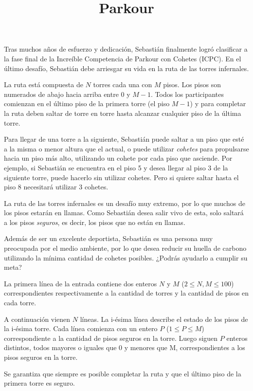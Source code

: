 \documentclass{oci}
\title{Parkour}
\begin{document}
\begin{problemDescription}
  Tras muchos años de esfuerzo y dedicación, Sebastián finalmente logró
  clasificar a la fase final de la Increíble Competencia de Parkour con
  Cohetes (ICPC).
  En el último desafío, Sebastián debe arriesgar
  su vida en la ruta de las torres infernales.

  La ruta está compuesta de $N$ torres cada una con
  $M$ pisos.
  Los pisos son numerados de abajo hacia arriba
  entre 0 y $M-1$.
  Todos los participantes comienzan en el último piso de la primera
  torre (el piso $M-1$) y para completar la ruta deben saltar de torre
  en torre hasta alcanzar cualquier piso de la última torre.

  Para llegar de una torre a la siguiente, Sebastián puede saltar a un piso
  que esté a la misma o menor altura que el actual, o puede utilizar \emph{cohetes}
  para propulsarse hacia un piso más alto, utilizando un cohete por cada piso que asciende.
  Por ejemplo, si Sebastián se encuentra en el piso 5 y desea llegar
  al piso 3 de la siguiente torre, puede hacerlo sin utilizar cohetes.
  Pero si quiere saltar hasta el piso 8 necesitará utilizar 3 cohetes.

  La ruta de las torres infernales es un desafío muy extremo, por
  lo que muchos de los pisos estarán en llamas.
  Como Sebastián desea salir vivo de esta, solo saltará a los pisos
  \emph{seguros}, es decir, los pisos que no están en llamas.

  Además de ser un excelente deportista, Sebastián es una persona muy
  preocupada por el medio ambiente, por lo que desea reducir su huella
  de carbono utilizando la mínima cantidad de cohetes posibles.
  ¿Podrás ayudarlo a cumplir su meta?

\end{problemDescription}

\begin{inputDescription}
  La primera línea de la entrada contiene dos enteros $N$ y $M$ ($2 \leq N, M \leq 100$)
  correspondientes respectivamente a la cantidad de torres y la cantidad de pisos en cada torre.

  A continuación vienen $N$ líneas.
  La i-ésima línea describe el estado de los pisos de la i-ésima torre.
  Cada línea comienza con un entero $P$ ($1 \leq P \leq M$) correspondiente
  a la cantidad de pisos seguros en la torre.
  Luego siguen $P$ enteros distintos, todos mayores o iguales que $0$ y menores que M,
  correspondientes a los pisos seguros en la torre.

  Se garantiza que siempre es posible completar la ruta y que el
  último piso de la primera torre es seguro.
\end{inputDescription}
\end{document}
